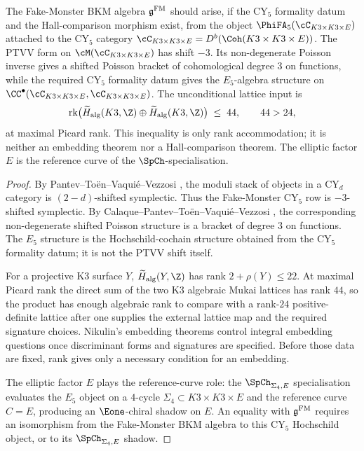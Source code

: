 \begin{conjecture}
\label{prop:fm-e5-poisson-placement}
\ClaimStatusConjectured
{}
The Fake-Monster BKM algebra $\mathfrak{g}^{\mathrm{FM}}$ should arise, if the CY$_5$ formality datum and the Hall-comparison morphism exist, from the object $\PhiFA_5(\cC_{K3 \times K3 \times E})$ attached to the CY$_5$ category $\cC_{K3 \times K3 \times E} = D^b(\Coh(K3 \times K3 \times E))$. The PTVV form on $\cM(\cC_{K3 \times K3 \times E})$ has shift $-3$. Its non-degenerate Poisson inverse gives a shifted Poisson bracket of cohomological degree \(3\) on functions, while the required CY$_5$ formality datum gives the $E_5$-algebra structure on $\CC^\bullet(\cC_{K3 \times K3 \times E},\cC_{K3 \times K3 \times E})$. The unconditional lattice input is
\[
 \mathrm{rk}\bigl(\widetilde H_{\mathrm{alg}}(K3,\Z)\oplus
 \widetilde H_{\mathrm{alg}}(K3,\Z)\bigr)
 \;\leq\;44,\qquad 44>24,
\]
at maximal Picard rank. This inequality is only rank accommodation; it is neither an embedding theorem nor a Hall-comparison theorem. The elliptic factor $E$ is the reference curve of the $\SpCh$-specialisation.
\end{conjecture}

\begin{proof}
By Pantev--To\"en--Vaqui\'e--Vezzosi \cite[Theorem~1.4]{PTVV2013}, the moduli stack of objects in a CY$_d$ category is $(2-d)$-shifted symplectic. Thus the Fake-Monster CY$_5$ row is $-3$-shifted symplectic. By Calaque--Pantev--To\"en--Vaqui\'e--Vezzosi \cite[Theorem~3.5]{CPTVV2017}, the corresponding non-degenerate shifted Poisson structure is a bracket of degree \(3\) on functions. The $E_5$ structure is the Hochschild-cochain structure obtained from the CY$_5$ formality datum; it is not the PTVV shift itself.

For a projective K3 surface $Y$, $\widetilde H_{\mathrm{alg}}(Y,\Z)$ has
rank $2+\rho(Y)\leq22$. At maximal Picard rank the direct sum of the two
K3 algebraic Mukai lattices has rank $44$, so the product has enough
algebraic rank to compare with a rank-$24$ positive-definite lattice
after one supplies the external lattice map and the required signature
choices. Nikulin's embedding theorems \cite{Nikulin1979} control
integral embedding questions once discriminant forms and signatures are
specified. Before those data are fixed, rank gives only a necessary
condition for an embedding.

The elliptic factor $E$ plays the reference-curve role: the $\SpCh_{\Sigma_4, E}$ specialisation evaluates the $E_5$ object on a $4$-cycle $\Sigma_4 \subset K3 \times K3 \times E$ and the reference curve $C = E$, producing an $\Eone$-chiral shadow on $E$. An equality with $\mathfrak{g}^{\mathrm{FM}}$ requires an isomorphism from the Fake-Monster BKM algebra to this CY$_5$ Hochschild object, or to its $\SpCh_{\Sigma_4,E}$ shadow.
\end{proof}

